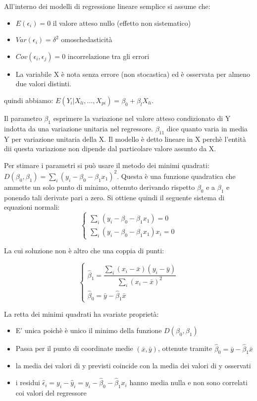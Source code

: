 \documentclass[a4paper]{extarticle}
\begin{document}
All'interno dei modelli di regressione lineare semplice si assume che:
\begin{itemize}
\item $E(\epsilon_i) = 0$ il valore atteso nullo (effetto non sistematico)
\item $Var(\epsilon_i) = \delta^2$ omoschedasticità
\item $Cov(\epsilon_i,\epsilon_j)=0$ incorrelazione tra gli errori 
\item La variabile X è nota senza errore (non stocastica) ed è osservata per almeno due valori distinti.
\end{itemize}

quindi abbiamo: $E(Y_i | X_{li},\dots,X_{pi}) = \beta_0 + \beta_l X_{li}$.

Il parametro $\beta_1$ esprimere la variazione nel valore atteso condizionato di Y indotta da una variazione unitaria nel regressore. $\beta_11$ dice quanto varia in media Y per variazione unitaria della X. Il modello è detto lineare in X perchè l'entità dii questa variazione non dipende dal particolare valore assunto da X.

Per stimare i parametri si può usare il metodo dei minimi quadrati: $D(\beta_0,\beta_1) = \sum\limits_i (y_i - \beta_0 - \beta_1x_1)^2$. Questa è una funzione quadratica che ammette  un solo punto di minimo, ottenuto derivando rispetto $\beta_0$ e a $\beta_1$ e ponendo tali derivate pari a zero. Si ottiene quindi il seguente sistema di equazioni normali:
\begin{equation*}
\begin{cases}
		\sum\limits_i(y_i-\beta_0 - \beta_1x_1) = 0\\
		\sum\limits_i(y_i-\beta_0 - \beta_1x_1)x_i = 0
	\end{cases}
\end{equation*}

La cui soluzione non è altro che una coppia di punti:

\begin{equation*}
\begin{cases}
		\hat \beta_1 = \dfrac{\sum\limits_i(x_i-\bar x)(y_i - \bar y)}{\sum\limits_i(x_i-\bar x)^2}\\
		\hat \beta_0 = \bar y - \hat \beta_1 \bar x
	\end{cases}
\end{equation*}

La retta dei minimi quadrati ha svariate proprietà:
\begin{itemize}
\item E' unica poichè è unico il minimo della funzione $D(\beta_0,\beta_1)$
\item Passa per il punto di coordinate medie $(\bar x, \bar y)$, ottenute tramite $\hat \beta_0 = \bar y - \hat \beta_1 \bar x$
\item la media dei valori di y previsti coincide con la media dei valori di y osservati
\item i residui $\hat \epsilon_i = y_i - \hat y_i = y_i - \hat \beta_0 - \hat \beta_1 x_i$ hanno media nulla e non sono correlati coi valori del regressore
\end{itemize} 
\end{document}
